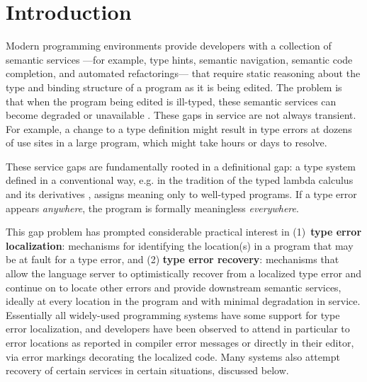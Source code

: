 \section{Introduction}
\label{sec:introduction}


Modern programming environments provide developers with a collection of semantic services%
---for example, type hints, semantic navigation, semantic code completion, and automated refactorings---%
that require static reasoning about the type and binding structure of a program as it is being edited. 
The problem is that when the program being edited is ill-typed, 
these semantic services can become degraded or unavailable \cite{HazelnutSNAPL}. 
These gaps in service are not always transient. 
For example, a change to a type definition might result in type errors at dozens of use sites in a large program, which might take hours or days to resolve.

These service gaps are fundamentally rooted in a definitional gap: a type system defined in a conventional way, 
e.g. in the tradition of the typed lambda calculus and its derivatives \cite{TaplBook,pfpl},
assigns meaning only to well-typed programs. 
If a type error appears \emph{anywhere}, the program is formally meaningless \emph{everywhere}.

This gap problem has prompted considerable practical interest in 
(1)~\textbf{type error localization}: mechanisms for identifying the location(s) in a program that may be at fault for a type error, and 
(2) \textbf{type error recovery}: mechanisms that allow the language server to optimistically recover from a localized type error 
and continue on to locate other errors and provide downstream semantic services, 
ideally at every location in the program and with minimal degradation in service.
Essentially all widely-used programming systems have some support for type error localization, and developers have been observed to attend in particular to error locations as reported in compiler error messages 
or directly in their editor, via error markings decorating the localized code.
Many systems also attempt recovery of certain services in certain situations, discussed below.


